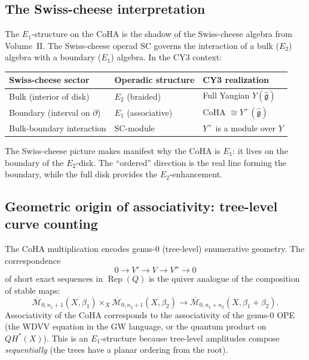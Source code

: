 \documentclass[11pt]{article}
\theoremstyle{definition}
\theoremstyle{remark}
\newcommand{\frakg}{\mathfrak{g}}
\begin{document}
\subsection{The Swiss-cheese interpretation}
\label{subsec:swiss-cheese}

The $E_1$-structure on the CoHA is the shadow of the Swiss-cheese algebra from
Volume~II. The Swiss-cheese operad $\mathrm{SC}$ governs the
interaction of a bulk ($E_2$) algebra with a boundary ($E_1$) algebra.
In the CY3 context:

\begin{center}
\renewcommand{\arraystretch}{1.4}
\begin{tabular}{lll}
 \textbf{Swiss-cheese sector} & \textbf{Operadic structure} & \textbf{CY3 realization} \\
 \hline
 Bulk (interior of disk) & $E_2$ (braided) & Full Yangian $Y(\widehat{\frakg})$ \\
 Boundary (interval on $\partial$) & $E_1$ (associative) & CoHA $\cong Y^+(\widehat{\frakg})$ \\
 Bulk-boundary interaction & $\mathrm{SC}$-module & $Y^+$ is a module over $Y$
\end{tabular}
\end{center}

\noindent
The Swiss-cheese picture makes manifest why the CoHA is $E_1$: it lives on the
boundary of the $E_2$-disk. The ``ordered'' direction is the real line forming
the boundary, while the full disk provides the $E_2$-enhancement.


\subsection{Geometric origin of associativity: tree-level curve counting}
\label{subsec:tree-level}

The CoHA multiplication encodes genus-0 (tree-level) enumerative geometry.
The correspondence
\[
 0 \to V' \to V \to V'' \to 0
\]
of short exact sequences in $\operatorname{Rep}(Q)$ is the quiver analogue of
the composition of stable maps:
\[
 \overline{\mathcal{M}}_{0,n_1+1}(X, \beta_1) \times_X
 \overline{\mathcal{M}}_{0,n_2+1}(X, \beta_2) \to
 \overline{\mathcal{M}}_{0,n_1+n_2}(X, \beta_1+\beta_2).
\]
Associativity of the CoHA corresponds to the associativity of the genus-0 OPE
(the WDVV equation in the GW language, or the quantum product on $QH^*(X)$).
This is an $E_1$-structure because tree-level amplitudes compose
\emph{sequentially} (the trees have a planar ordering from the root).
\end{document}
